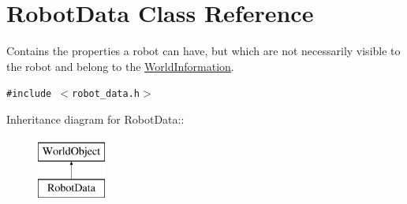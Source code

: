 \hypertarget{class_robot_data}{
\section{RobotData Class Reference}
\label{class_robot_data}
}
Contains the properties a robot can have, but which are not necessarily visible to the robot and belong to the \hyperlink{class_world_information}{WorldInformation}.  


{\tt \#include $<$robot\_\-data.h$>$}

Inheritance diagram for RobotData::\begin{figure}[H]
\begin{center}
\leavevmode
\includegraphics[height=2cm]{class_robot_data}
\end{center}
\end{figure}
